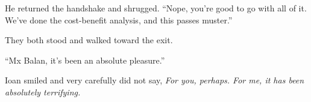 He returned the handshake and shrugged. ``Nope, you're good to go with all of it. We've done the cost-benefit analysis, and this passes muster.''

They both stood and walked toward the exit.

``Mx Balan, it's been an absolute pleasure.''

Ioan smiled and very carefully did not say, \emph{For you, perhaps. For me, it has been absolutely terrifying.}
